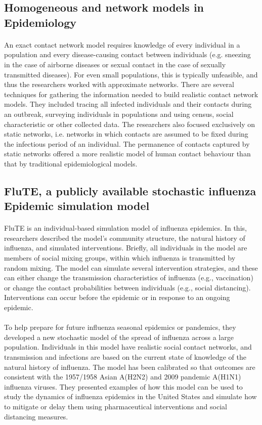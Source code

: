 \documentclass[12pt, a4paper]{extarticle}
\begin{document}
	    \subsection{Homogeneous and network models in Epidemiology}
            \paragraph{} An exact contact network model requires knowledge of every individual in a population and every disease-causing contact between individuals (e.g. sneezing in the case of airborne diseases or sexual contact in the case of sexually transmitted diseases). For even small populations, this is typically unfeasible, and thus the researchers worked with approximate networks. There are several techniques for gathering the information needed to build realistic contact network models. They included tracing all infected individuals and their contacts during an outbreak, surveying individuals in populations and using census, social characteristic or other collected data. The researchers also focused exclusively on static networks, i.e. networks in which contacts are assumed to be fixed during the infectious period of an individual. The permanence of contacts captured by static networks offered a more realistic model of human contact behaviour than that by traditional epidemiological models.
        \subsection{FluTE, a publicly available stochastic influenza Epidemic simulation model}
            \paragraph{} FluTE is an individual-based simulation model of influenza epidemics. In this, researchers described the model's community structure, the natural history of influenza, and simulated interventions. Briefly, all individuals in the model are members of social mixing groups, within which influenza is transmitted by random mixing. The model can simulate several intervention strategies, and these can either change the transmission characteristics of influenza (e.g., vaccination) or change the contact probabilities between individuals (e.g., social distancing). Interventions can occur before the epidemic or in response to an ongoing epidemic.
	        \paragraph{} To help prepare for future influenza seasonal epidemics or pandemics, they developed a new stochastic model of the spread of influenza across a large population. Individuals in this model have realistic social contact networks, and transmission and infections are based on the current state of knowledge of the natural history of influenza. The model has been calibrated so that outcomes are consistent with the 1957/1958 Asian A(H2N2) and 2009 pandemic A(H1N1) influenza viruses. They presented examples of how this model can be used to study the dynamics of influenza epidemics in the United States and simulate how to mitigate or delay them using pharmaceutical interventions and social distancing measures.
\end{document}
